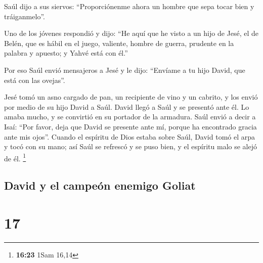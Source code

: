  Saúl dijo a sus siervos: ``Proporciónenme ahora un
hombre que sepa tocar bien y tráiganmelo''.

 Uno de los jóvenes respondió y dijo: ``He aquí que he
visto a un hijo de Jesé, el de Belén, que es hábil en el juego,
valiente, hombre de guerra, prudente en la palabra y apuesto; y Yahvé
está con él.''

 Por eso Saúl envió mensajeros a Jesé y le dijo:
``Envíame a tu hijo David, que está con las ovejas''.

 Jesé tomó un asno cargado de pan, un recipiente de vino
y un cabrito, y los envió por medio de su hijo David a Saúl.
 David llegó a Saúl y se presentó ante él. Lo amaba
mucho, y se convirtió en su portador de la armadura. 
Saúl envió a decir a Isaí: ``Por favor, deja que David se presente ante
mí, porque ha encontrado gracia ante mis ojos''.  Cuando
el espíritu de Dios estaba sobre Saúl, David tomó el arpa y tocó con su
mano; así Saúl se refrescó y se puso bien, y el espíritu malo se alejó
de él. \footnote{\textbf{16:23} 1Sam 16,14}

\hypertarget{david-y-el-campeuxf3n-enemigo-goliat}{%
\subsection{David y el campeón enemigo
Goliat}\label{david-y-el-campeuxf3n-enemigo-goliat}}

\hypertarget{section-16}{%
\section{17}\label{section-16}}

